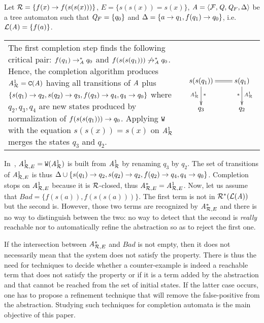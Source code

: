 \begin{example}
\label{ex:comp}
Let $\mathcal R=\{f(x) \rightarrow f(s(s(x)))\}$, $E=\{s(s(x))=s(x)\}$, $\mathit A=\langle \mathcal{F}, \mathit Q, \mathit Q_F,
\Delta\rangle$ be a tree automaton such that $\mathit Q_F=\{q_0\}$ and $\Delta=\{ a \rightarrow
q_1, f(q_1) \rightarrow q_0\}$, i.e. $\mathcal{L}(\mathit A)=\{f(a)\}$.
\begin{tabular}{lc}
  \hspace{-.3cm}
  \begin{minipage}{.75\linewidth}
    The first completion step finds the following critical pair: $f(q_1) \rightarrow_\mathit A^* q_0$
    and $f(s(s(q_1))) \not\rightarrow_\mathit A^* q_0$. Hence, the completion algorithm produces
    ${\it A}_{\mathcal R}^1=\mathtt{C}(\mathit A)$ having all transitions of $\mathit A$ plus $\{s(q_1) \rightarrow q_2, s(q_2) \rightarrow q_3,
    f(q_3) \rightarrow q_4, q_4 \rightarrow q_0\}$ where $q_2, q_3, q_4$ are new states produced
    by normalization of $f(s(s(q_1))) \rightarrow q_0$. Applying $\mathtt{W}$ with
    the equation $s(s(x))=s(x)$ on ${\it A}_{\mathcal R}^1$ merges the states $q_3$ and $q_2$.
  \end{minipage}&
  \begin{minipage}{.25\linewidth}
    $\xymatrix{
      s(s(q_1)) \ar@{=}[r]\ar[d]_{\aaex^1}^{*} & s(q_1) \ar[d]_{*}^{\aaex^1}\\
      q_3 & q_2
    }
    $
  \end{minipage}
\end{tabular}





In~\cite{GenetR-JSC10}, $\mathit A^1_{\mathcal R,E}=\mathtt{W}({\it A}_{\mathcal R}^1)$ is built from ${\it A}_{\mathcal R}^1$ by renaming $q_3$ by
$q_2$. The set of transitions of $\mathit A^1_{\mathcal R,E}$ is thus $\Delta \cup \{s(q_1) \rightarrow
q_2, s(q_2) \rightarrow q_2, f(q_2) \rightarrow q_4, q_4 \rightarrow q_0\}$.  Completion stops on
$\mathit A^1_{\mathcal R,E}$ because it is $\mathcal R$-closed, thus $\mathit A^*_{\mathcal R,E}=\mathit A^1_{\mathcal R,E}$.
Now, let us assume that $Bad=\{f(s(a)), f(s(s(a)))\}$. The first term is not in
$\mathcal R^*(\mathcal{L}(\mathit A))$ but the second is. However, those two terms are 
recognized by $\mathit A^*_{\mathcal R,E}$ and there is no way to distinguish between
the two: no way to detect that the second is {\em really} reachable
nor to automatically refine the abstraction so as to reject the first
one.
\end{example}


If the intersection between $\mathit A^*_{\mathcal R,E}$ and $Bad$ is not empty, then it
does not necessarily mean that the system does not satisfy the
property. There is thus the need for techniques to decide whether a
counter-example is indeed a reachable term that does not satisfy the
property or if it is a term added by the abstraction and that cannot
be reached from the set of initial states. If the latter case occurs,
one has to propose a refinement technique that will remove the
false-positive from the abstraction. Studying such techniques for
completion automata is the main objective of this paper.

